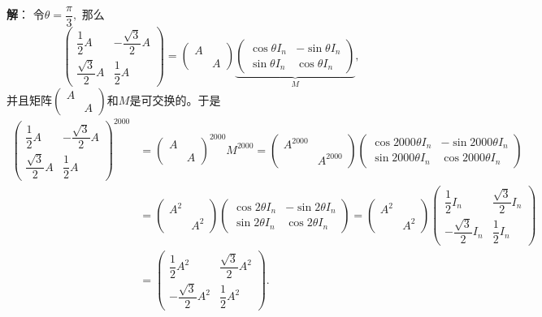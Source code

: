 {\bf 解}： 令$\theta = \dfrac{\pi}{3},$ 那么
$$\begin{pmatrix} \dfrac{1}{2} A & - \dfrac{\sqrt{3}}{2} A \\ \dfrac{\sqrt{3}}{2} A & \dfrac{1}{2} A \end{pmatrix} = \begin{pmatrix} A & \\ & A \end{pmatrix} \underbrace{\begin{pmatrix} \cos\theta I_n & - \sin\theta I_n \\ \sin\theta I_n & \cos\theta I_n \end{pmatrix}}_M,$$
并且矩阵$\begin{pmatrix} A & \\ & A \end{pmatrix}$和$M$是可交换的。于是
\begin{align*}
\begin{pmatrix} \dfrac{1}{2} A & - \dfrac{\sqrt{3}}{2} A \\ \dfrac{\sqrt{3}}{2} A & \dfrac{1}{2} A \end{pmatrix}^{2000} & = \begin{pmatrix} A & \\ & A \end{pmatrix}^{2000} M^{2000} = \begin{pmatrix} A^{2000} & \\ & A^{2000} \end{pmatrix} \begin{pmatrix} \cos 2000\theta I_n & - \sin 2000\theta I_n \\ \sin 2000\theta I_n & \cos 2000\theta I_n \end{pmatrix} \\
& = \begin{pmatrix} A^2 & \\ & A^2 \end{pmatrix} \begin{pmatrix} \cos 2\theta I_n & - \sin 2\theta I_n \\ \sin 2\theta I_n & \cos 2\theta I_n \end{pmatrix} = \begin{pmatrix} A^2 & \\ & A^2 \end{pmatrix} \begin{pmatrix} \dfrac{1}{2} I_n & \dfrac{\sqrt{3}}{2} I_n \\ - \dfrac{\sqrt{3}}{2} I_n & \dfrac{1}{2} I_n \end{pmatrix} \\
& = \begin{pmatrix} \dfrac{1}{2} A^2 & \dfrac{\sqrt{3}}{2} A^2 \\ - \dfrac{\sqrt{3}}{2} A^2 & \dfrac{1}{2} A^2 \end{pmatrix}.
\end{align*}

